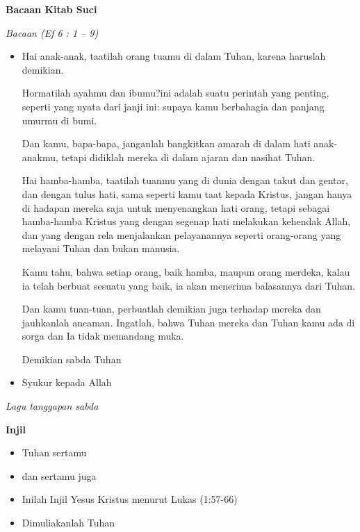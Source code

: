 \documentclass[titlepage,10pt,openany]{scrbook}
\makeatletter
\newcommand{\subjudul}[1]{%
  {\parindent \z@ 
    \interlinepenalty\@M \bfseries #1\par\nobreak \vskip 10\p@ }}
\newcommand{\keterangan}[1]{%
  {\parindent \z@  \slshape 
    \interlinepenalty\@M \textsl{#1}\par\nobreak  \vskip 5\p@}}
\newcommand{\BU}[1]{\begin{itemize} \item[U:] #1 \end{itemize}}
\newcommand{\BI}[1]{\begin{itemize} \item[I:] #1 \end{itemize}}
\newcommand{\BP}[1]{\begin{itemize} \item[P:] #1 \end{itemize}}
\makeatother
\begin{document}
\subjudul{Bacaan Kitab Suci}

\keterangan{Bacaan (Ef 6 : 1 – 9)}

\BP{Hai anak-anak, taatilah orang tuamu di dalam Tuhan, karena haruslah demikian.

Hormatilah ayahmu dan ibumu?ini adalah suatu perintah yang penting, seperti yang nyata dari janji ini:
supaya kamu berbahagia dan panjang umurmu di bumi.

Dan kamu, bapa-bapa, janganlah bangkitkan amarah di dalam hati anak-anakmu, tetapi didiklah mereka di dalam ajaran dan nasihat Tuhan.

Hai hamba-hamba, taatilah tuanmu yang di dunia dengan takut dan gentar, dan dengan tulus hati, sama seperti kamu taat kepada Kristus,
jangan hanya di hadapan mereka saja untuk menyenangkan hati orang, tetapi sebagai hamba-hamba Kristus yang dengan segenap hati melakukan kehendak Allah, dan yang dengan rela menjalankan pelayanannya seperti orang-orang yang melayani Tuhan dan bukan manusia.

Kamu tahu, bahwa setiap orang, baik hamba, maupun orang merdeka, kalau ia telah berbuat sesuatu yang baik, ia akan menerima balasannya dari Tuhan.

Dan kamu tuan-tuan, perbuatlah demikian juga terhadap mereka dan jauhkanlah ancaman. Ingatlah, bahwa Tuhan mereka dan Tuhan kamu ada di sorga dan Ia tidak memandang muka.

Demikian sabda Tuhan
}

\BU{Syukur kepada Allah} 

\keterangan{Lagu tanggapan sabda}
 

\subjudul{Injil}

\BP{Tuhan sertamu}

\BU{dan sertamu juga} 

\BI{Inilah Injil Yesus Kristus menurut Lukas (1:57-66)}

\BU{Dimuliakanlah Tuhan}
\end{document}
